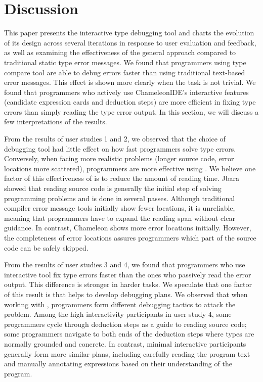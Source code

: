 \section{Discussion}


This paper presents the interactive type debugging tool \chameleon{} and charts the evolution of its design across several iterations in response to user evaluation and feedback, as well as examining the effectiveness of the general approach compared to traditional static type error messages. We found that programmers using \chameleon{} type compare tool are able to debug errors faster than using traditional text-based error messages. This effect is shown more clearly when the task is not trivial. We found that programmers who actively use ChameleonIDE's interactive features (candidate expression cards and deduction steps) are more efficient in fixing type errors than simply reading the type error output. In this section, we will discuss a few interpretations of the results.


From the results of user studies 1 and 2, we observed that the choice of debugging tool had little effect on how fast programmers solve type errors. Conversely, when facing more realistic problems (longer source code, error locations more scattered), programmers are more effective using \chameleon{}. We believe one factor of this effectiveness of \chameleon{} is to reduce the amount of reading time. Jbara \cite{jbara_how_2015} showed that reading source code is generally the initial step of solving programming problems and is done in several passes. Although traditional compiler error message tools initially show fewer locations, it is unreliable, meaning that programmers have to expand the reading span without clear guidance. In contrast, Chameleon shows more error locations initially. However, the completeness of error locations assures programmers which part of the source code can be safely skipped.


From the results of user studies 3 and 4, we found that programmers who use interactive tool fix type errors faster than the ones who passively read the error output. This difference is stronger in harder tasks. We speculate that one factor of this result is that  \chameleon{} helps to develop debugging plans. We observed that when working with \chameleon{}, programmers form different debugging tactics to attack the problem. Among the high interactivity participants in user study 4, some programmers cycle through deduction steps as a guide to reading source code; some programmers navigate to both ends of the deduction steps where types are normally grounded and concrete. In contrast, minimal interactive participants generally form more similar plans, including carefully reading the program text and manually annotating expressions based on their understanding of the program.

